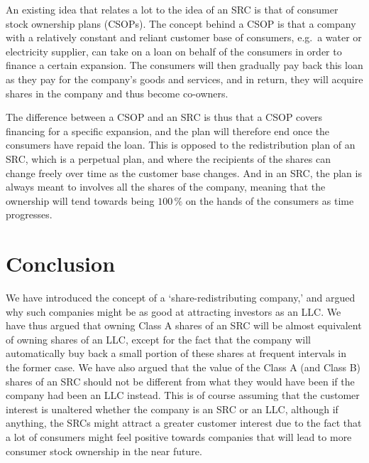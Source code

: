 \documentclass{article}
\begin{document}
An existing idea that relates a lot to the idea of an SRC is that of consumer stock ownership plans (CSOPs). 
The concept behind a CSOP is that a company with a relatively constant and reliant customer base of consumers, e.g.\ a water or electricity supplier, can take on a loan on behalf of the consumers in order to finance a certain expansion. The consumers will then gradually pay back this loan as they pay for the company's goods and services, and in return, they will acquire shares in the company and thus become co-owners. 

The difference between a CSOP and an SRC is thus that a CSOP covers financing for a specific expansion, and the plan will therefore end once the consumers have repaid the loan. This is opposed to the redistribution plan of an SRC, which is a perpetual plan, and where the recipients of the shares can change freely over time as the customer base changes. And in an SRC, the plan is always meant to involves all the shares of the company, meaning that the ownership will tend towards being $100\,\%$ on the hands of the consumers as time progresses. 



\section{Conclusion} 

We have introduced the concept of a `share-redistributing company,' and argued why such companies might be as good at attracting investors as an LLC. We have thus argued that owning Class A shares of an SRC will be almost equivalent of owning shares of an LLC, except for the fact that the company will automatically buy back a small portion of these shares at frequent intervals in the former case. We have also argued that the value of the Class A (and Class B) shares of an SRC should not be different from what they would have been if the company had been an LLC instead. 
%
This is of course assuming that the customer interest is unaltered whether the company is an SRC or an LLC, although if anything, the SRCs might attract a greater customer interest due to the fact that a lot of consumers might feel positive towards companies that will lead to more consumer stock ownership in the near future. 
\end{document}
